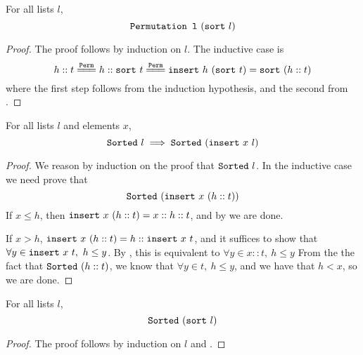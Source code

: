 \documentclass[sigplan,10pt,anonymous,review]{thesis}
\begin{document}
\begin{theorem}
  For all lists $l$,
  \begin{equation*}
    \texttt{\textup{Permutation~l}}~(\texttt{\textup{sort}}~l)
  \end{equation*}
\end{theorem}
\begin{proof}
  The proof follows by induction on $l$. The inductive case is
  \begin{equation*}
    h :: t \eqperm h :: \var{sort}~t \eqperm
    \var{insert}~h~(\var{sort}~t) = \var{sort}~(h :: t)
  \end{equation*}
  where the first step follows from the induction hypothesis, and the
  second from .
\end{proof}

\begin{lemma}
  For all lists $l$ and elements $x$,
  \begin{equation*}
    \texttt{\textup{Sorted}}~l \implies \texttt{\textup{Sorted}}~(\texttt{\textup{insert}}~x~l)
  \end{equation*}
\end{lemma}
\begin{proof}
  We reason by induction on the proof that $\texttt{\textup{Sorted}}~l$. In the
  inductive case we need prove that
  \begin{equation*}
    \texttt{\textup{Sorted}}~(\texttt{\textup{insert}}~x~(h::t))
  \end{equation*}
  If $x \le h$, then $\texttt{\textup{insert}}~x~(h::t) = x :: h :: t$, and by
   we are done.

  If $x > h$, $\texttt{\textup{insert}}~x~(h::t) = h :: \texttt{\textup{insert}}~x~t$, and it
  suffices to show that $\forall y \in \texttt{\textup{insert}}~x~t,~h \le y$. By
  , this is equivalent to $\forall y \in x::t,~h \le y$ From
  the the fact that $\texttt{\textup{Sorted}}~(h::t)$, we know that $\forall y \in t,~h \le
  y$, and we have that $h < x$, so we are done.
\end{proof}

\begin{theorem}
  For all lists $l$,
  \begin{equation*}
    \texttt{\textup{Sorted}}~(\texttt{\textup{sort}}~l)
  \end{equation*}
\end{theorem}
\begin{proof}
  The proof follows by induction on $l$ and .
\end{proof}
\end{document}

